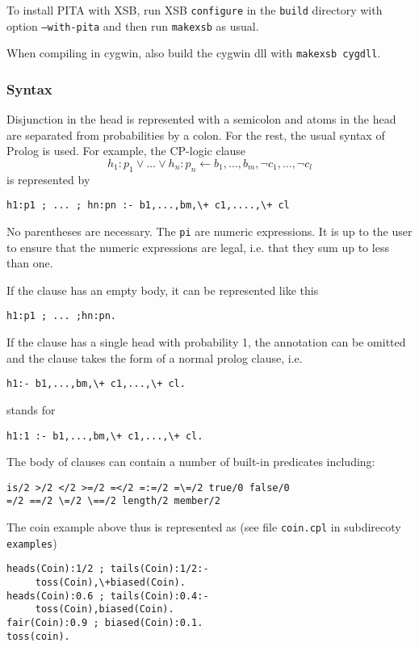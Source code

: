 To install PITA with XSB, run XSB \texttt{configure} in the \texttt{build} directory with option \texttt{--with-pita} and then run \texttt{makexsb} as usual.

When compiling in cygwin, also build the cygwin dll with \texttt{makexsb cygdll}.


\subsubsection{Syntax}

Disjunction in the head is represented with a semicolon and atoms in the head are separated from probabilities by a colon. For the rest, the usual syntax of Prolog is used.
For example, the  CP-logic clause
$$h_1:p_1\vee \ldots \vee h_n:p_n\leftarrow b_1,\dots,b_m ,\neg c_1,\ldots,\neg c_l$$
is represented by
\begin{verbatim}
h1:p1 ; ... ; hn:pn :- b1,...,bm,\+ c1,....,\+ cl
\end{verbatim}
 No parentheses are necessary. The \texttt{pi} are numeric expressions. It is up to the user to ensure that the numeric expressions are legal, i.e. that they sum up to less than one.

If the clause has an empty body, it can be represented like this
\begin{verbatim}
h1:p1 ; ... ;hn:pn.
\end{verbatim}
If the clause has a single head with probability 1, the annotation can be omitted and the clause takes the form of a normal prolog clause, i.e. 
\begin{verbatim}
h1:- b1,...,bm,\+ c1,...,\+ cl.
\end{verbatim}
stands for 
\begin{verbatim}
h1:1 :- b1,...,bm,\+ c1,...,\+ cl.
\end{verbatim}



The body of clauses can contain a number of built-in predicates including:
\begin{verbatim}
is/2 >/2 </2 >=/2 =</2 =:=/2 =\=/2 true/0 false/0
=/2 ==/2 \=/2 \==/2 length/2 member/2
\end{verbatim}
The coin example above thus is represented as (see file \texttt{coin.cpl} in subdirecoty \texttt{examples})
\begin{verbatim}
heads(Coin):1/2 ; tails(Coin):1/2:- 
     toss(Coin),\+biased(Coin).
heads(Coin):0.6 ; tails(Coin):0.4:- 
     toss(Coin),biased(Coin).
fair(Coin):0.9 ; biased(Coin):0.1.
toss(coin).
\end{verbatim}


